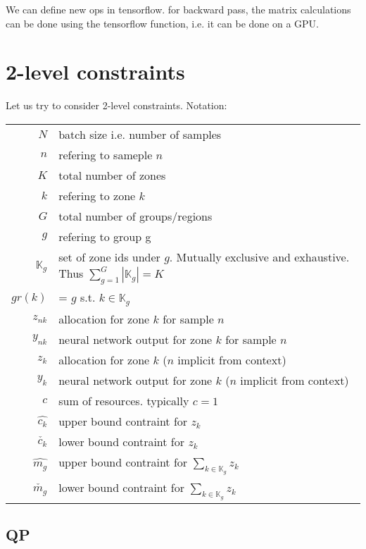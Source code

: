 \documentclass[11 pt]{article}
\begin{document}
We can define new ops in tensorflow. for backward pass, the matrix calculations can be done using the tensorflow function, i.e. it can be done on a GPU.


\section{2-level constraints}

Let us try to consider 2-level constraints. Notation:

\begin{center}
    \begin{tabular}{r l}
        $N$ & batch size i.e. number of samples \\
        $n$ & refering to sameple $n$ \\
        $K$ & total number of zones \\
        $k$ & refering to zone $k$ \\
        $G$ & total number of groups/regions \\
        $g$ & refering to group g \\
        $\mathbb{K}_g$ & set of zone ids under $g$. Mutually exclusive and exhaustive. Thus $\sum_{g=1}^G |\mathbb{K}_g| = K$ \\
        $gr(k)$ & = $g$ s.t. $k \in \mathbb{K}_g$ \\
        $z_{nk}$ & allocation for zone $k$ for sample $n$ \\
        $y_{nk}$ & neural network output for zone $k$ for sample $n$\\
        $z_k$ & allocation for zone $k$ ($n$ implicit from context)\\
        $y_k$ & neural network output for zone $k$ ($n$ implicit from context)\\
        $c$ & sum of resources. typically $c=1$ \\
        $\hat{c_k}$ & upper bound contraint for $z_k$ \\
        $\check{c_k}$ & lower bound contraint for $z_k$ \\
        $\hat{m_g}$ & upper bound contraint for $\sum_{k \in \mathbb{K}_g} z_k$ \\
        $\check{m_g}$ & lower bound contraint for $\sum_{k \in \mathbb{K}_g} z_k$  \\
    \end{tabular}
\end{center}

\subsection{QP}
\end{document}
